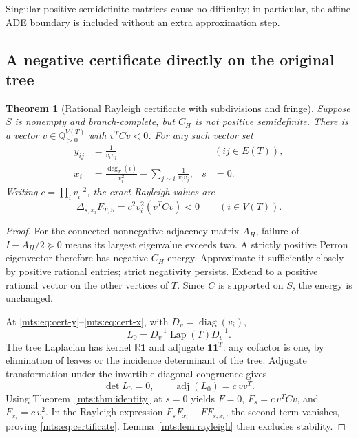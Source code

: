 \documentclass[11pt]{article}
\numberwithin{equation}{section}
\newtheorem{theorem}{Theorem}[section]
\theoremstyle{definition}
\newcommand{\R}{\mathbb R}
\newcommand{\one}{\mathbf 1}
\newcommand{\diag}{\operatorname{diag}}
\newcommand{\adj}{\operatorname{adj}}
\newcommand{\Lap}{\operatorname{Lap}}
\newcommand{\del}{\Delta}
\begin{document}
Singular positive-semidefinite matrices cause no difficulty; in particular,
the affine ADE boundary is included without an extra approximation step.

\subsection{A negative certificate directly on the original tree}

\begin{theorem}[Rational Rayleigh certificate with subdivisions and fringe]\label{mts:thm:certificate}
Suppose $S$ is nonempty and branch-complete, but $C_H$ is not positive
semidefinite. There is a vector $v\in\mathbb Q_{>0}^{V(T)}$ with $v^TCv<0$.
For any such vector set
\begin{align}
 y_{ij}&=\frac1{v_iv_j} &&(ij\in E(T)),\label{mts:eq:cert-y}\\
 x_i&=\frac{\deg_T(i)}{v_i^2}-\sum_{j\sim i}\frac1{v_iv_j},
 &s&=0.\label{mts:eq:cert-x}
\end{align}
Writing $c=\prod_i v_i^{-2}$, the exact Rayleigh values are
\begin{equation}
 \del_{s,x_i}F_{T,S}=c^2v_i^2(v^TCv)<0
 \qquad(i\in V(T)).
 \label{mts:eq:certificate}
\end{equation}
\end{theorem}
\begin{proof}
For the connected nonnegative adjacency matrix $A_H$, failure of
$I-A_H/2\succeq0$ means its largest eigenvalue exceeds two. A strictly
positive Perron eigenvector therefore has negative $C_H$ energy. Approximate
it sufficiently closely by positive rational entries; strict negativity
persists. Extend to a positive rational vector on the other vertices of
$T$. Since $C$ is supported on $S$, the energy is unchanged.

At \eqref{mts:eq:cert-y}--\eqref{mts:eq:cert-x}, with $D_v=\diag(v_i)$,
\begin{equation}
 L_0=D_v^{-1}\Lap(T)D_v^{-1}.
 \label{mts:eq:lap-congruence}
\end{equation}
The tree Laplacian has kernel $\R\one$ and adjugate $\one\one^T$: any
cofactor is one, by elimination of leaves or the incidence determinant of
the tree. Adjugate transformation under the invertible diagonal
congruence gives
\[
 \det L_0=0,\qquad \adj(L_0)=c\,vv^T.
\]
Using Theorem~\ref{mts:thm:identity} at $s=0$ yields
$F=0$, $F_s=c\,v^TCv$, and $F_{x_i}=c\,v_i^2$. In the Rayleigh expression
$F_sF_{x_i}-FF_{s,x_i}$, the second term vanishes, proving
\eqref{mts:eq:certificate}. Lemma~\ref{mts:lem:rayleigh} then excludes stability.
\end{proof}
\end{document}
